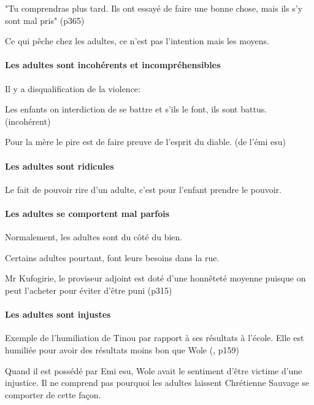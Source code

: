 \documentclass[a4paper, 11pt, hidelinks]{article}
\newcommand{\bs}{\bigskip}
\newcommand{\rb}[1]{\Romanbar{#1}}
\begin{document}
"Tu comprendras plus tard. Ils ont essayé de faire une bonne chose, mais ils s'y sont mal pris" (p365)
\bs

Ce qui pêche chez les adultes, ce n'est pas l'intention mais les moyens.


\paragraph{Les adultes sont incohérents et incompréhensibles}


Il y a disqualification de la violence:

Les enfants on interdiction de se battre et s'ils le font, ils sont battus. (incohérent)
\bs



Pour la mère le pire est de faire preuve de l'esprit du diable. (de l'émi esu)



\paragraph{Les adultes sont ridicules}

Le fait de pouvoir rire d'un adulte, c'est pour l'enfant prendre le pouvoir.


\paragraph{Les adultes se comportent mal parfois}

Normalement, les adultes sont du côté du bien.


Certains adultes pourtant, font leurs besoins dans la rue.

Mr Kufogirie, le proviseur adjoint est doté d'une honnêteté moyenne puisque on peut l'acheter pour éviter d'être puni (p315)




\paragraph{Les adultes sont injustes}

Exemple de l'humiliation de Tinou par rapport à ses résultats à l'école. Elle est humiliée pour avoir
des résultats moins bon que Wole (\rb{6}, p159)

\bs

Quand il est possédé par Emi esu, Wole avait le sentiment d'être victime d'une injustice.
Il ne comprend pas pourquoi les adultes laissent Chrétienne Sauvage se comporter de cette façon.
\end{document}
